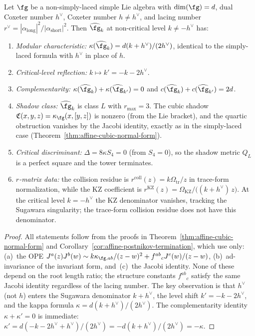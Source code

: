 \begin{proposition}%
\label{prop:nsl-shadow-tower}
Let $\fg$ be a non-simply-laced simple Lie algebra with
$\dim(\fg) = d$, dual Coxeter number $h^\vee$, Coxeter number
$h \neq h^\vee$, and lacing number $r^\vee = |\alpha_{\mathrm{long}}|^2/|\alpha_{\mathrm{short}}|^2$.
Then $\widehat{\fg}_k$ at non-critical level $k \neq -h^\vee$ has:
\begin{enumerate}[label=\textup{(\roman*)}]
\item \emph{Modular characteristic:}
 $\kappa(\widehat{\fg}_k) = d(k+h^\vee)/(2h^\vee)$, identical to
 the simply-laced formula with $h^\vee$ in place of $h$.
\item \emph{Critical-level reflection:}
 $k \mapsto k' = -k-2h^\vee$.
\item \emph{Complementarity:}
 $\kappa(\widehat{\fg}_k) + \kappa(\widehat{\fg}_{k'}) = 0$ and
 $c(\widehat{\fg}_k) + c(\widehat{\fg}_{k'}) = 2d$.
\item \emph{Shadow class:}
 $\widehat{\fg}_k$ is class $L$ with $r_{\max} = 3$. The
 cubic shadow $\mathfrak{C}(x,y,z) = \kappa_{\fg}(x,[y,z])$ is
 nonzero \textup{(}from the Lie bracket\textup{)}, and the
 quartic obstruction vanishes by the Jacobi identity, exactly as
 in the simply-laced case
 \textup{(}Theorem~\textup{\ref{thm:affine-cubic-normal-form})}.
\item \emph{Critical discriminant:}
 $\Delta = 8\kappa S_4 = 0$ \textup{(}from $S_4 = 0$\textup{)},
 so the shadow metric $Q_L$ is a perfect square and the
 tower terminates.
\item \emph{$r$-matrix data:}
 the collision residue is
 $r^{\mathrm{coll}}(z)=k\Omega_{\mathrm{tr}}/z$ in trace-form
 normalization, while the KZ coefficient is
 $r^{\mathrm{KZ}}(z) =
 \Omega_{\mathrm{KZ}}/\bigl((k{+}h^\vee)\,z\bigr)$.
 At the critical level $k = -h^\vee$ the KZ denominator vanishes,
 tracking the Sugawara singularity; the trace-form collision residue
 does not have this denominator.
\end{enumerate}
\end{proposition}

\begin{proof}
All statements follow from the proofs in
Theorem~\ref{thm:affine-cubic-normal-form} and
Corollary~\ref{cor:affine-postnikov-termination}, which use only:
(a)~the OPE $J^a(z)J^b(w) \sim k\kappa_{\fg,ab}/(z-w)^2 +
f^{ab}{}_c J^c(w)/(z-w)$, (b)~ad-invariance of the invariant form,
and~(c)~the Jacobi identity. None of these depend on the root
length ratio; the structure constants $f^{ab}{}_c$ satisfy the same
Jacobi identity regardless of the lacing number. The key
observation is that $h^\vee$ (not $h$) enters the Sugawara
denominator $k + h^\vee$, the level shift $k' = -k - 2h^\vee$,
and the kappa formula $\kappa = d(k+h^\vee)/(2h^\vee)$. The
complementarity identity $\kappa + \kappa' = 0$ is
immediate: $\kappa' = d(-k - 2h^\vee + h^\vee)/(2h^\vee)
= -d(k + h^\vee)/(2h^\vee) = -\kappa$.
\end{proof}


